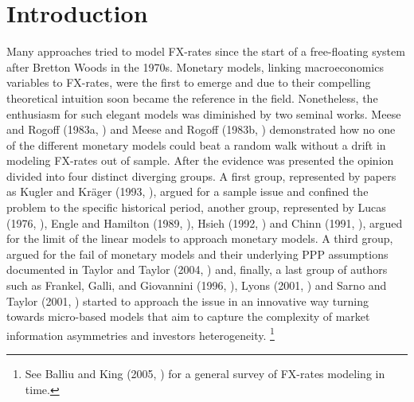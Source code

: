 \section{Introduction}

%
%
Many approaches tried to model FX-rates since the start of a
free-floating system after Bretton Woods in the 1970s. Monetary
models, linking macroeconomics variables to FX-rates, were the first to
emerge and due to their compelling theoretical intuition soon became
the reference in the field. Nonetheless, the enthusiasm for such
elegant models was diminished by two seminal works. Meese and Rogoff
(1983a, \cite{MeeseRogoffa}) and Meese and Rogoff (1983b,
\cite{MeeseRogoffb}) demonstrated how no one of the different monetary
models could beat a random walk without a drift in modeling FX-rates
out of sample. After the evidence was presented the opinion divided
into four distinct diverging groups. A first group, represented by
papers as Kugler and Kr{\"a}ger (1993, \cite{KuglerKrager}), argued
for a sample issue and confined the problem to the specific historical
period, another group, represented by Lucas (1976, \cite{Lucas}),
Engle and Hamilton (1989, \cite{EngleHamilton}), Hsieh (1992,
\cite{Hsieh}) and Chinn (1991, \cite{Chinn}), argued for the limit of
the linear models to approach monetary models.  A third group, argued
for the fail of monetary models and their underlying PPP assumptions
documented in Taylor and Taylor (2004, \cite{TaylorTaylor}) and,
finally, a last group of authors such as Frankel, Galli, and
Giovannini (1996, \cite{FrenkelGalliGiovannini}), Lyons (2001,
\cite{Lyons}) and Sarno and Taylor (2001, \cite{SarnoTaylor}) started
to approach the issue in an innovative way turning towards micro-based
models that aim to capture the complexity of market information
asymmetries and investors heterogeneity.  \footnote{See Balliu and
  King (2005, \cite{BalliuKing}) for a general survey of FX-rates
  modeling in time.}


